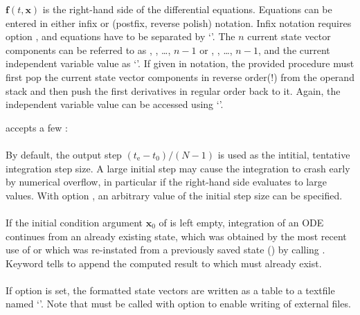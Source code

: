 \documentclass[11pt,english,BCOR10mm,DIV12,bibliography=totoc,parskip=false,smallheadings
    headexclude,footexclude,oneside,dvips,UKenglish]{pst-doc}
\begin{document}
$\mathbf{f}(t,\mathbf{x})$ is the right-hand side of the differential equations. Equations can be entered in either infix or \PS{} (postfix, reverse polish) notation. Infix notation requires option , and equations have to be separated by `\Lkeyword{|}'. The $n$ current state vector components can be referred to as , , \dots, \Lkeyword{x[}$n-1$\Lkeyword{]} or , , \dots, \Lkeyword{y[}$n-1$\Lkeyword{]}, and the current independent variable value as `'. If given in \PS{} notation, the provided procedure must first pop the current state vector components in reverse order(!) from the operand stack and then push the first derivatives in regular order back to it. Again, the independent variable value can be accessed using `'.%

\newpage
\noindent{} accepts a few \OptArgs:\\%

\noindent{}\\
\noindent By default, the output step $(t_\mathrm{e}-t_\mathrm{0})/(N-1)$ is used as the intitial, tentative integration step size. A large initial step may cause the integration to crash early by numerical overflow, in particular if the right-hand side evaluates to large values. With option , an arbitrary value of the initial step size can be specified.\\

\noindent{}\\
If the initial condition argument $\mathbf{x}_0$ of  is left empty, integration of an ODE continues from an already existing state, which was obtained by the most recent use of  or which was re-instated from a previously saved state () by calling . Keyword  tells  to append the computed result to  which must already exist.\\

\noindent{}\\
If option  is set, the formatted state vectors are written as a table to a textfile named `'. Note that  must be called with option  to enable writing of external files.\\
\end{document}
